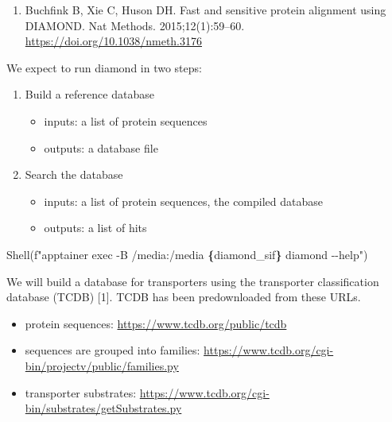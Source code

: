 \documentclass[
]{book}
\newenvironment{Shaded}{\begin{snugshade}}{\end{snugshade}}
\newcommand{\NormalTok}[1]{#1}
\newcommand{\SpecialCharTok}[1]{\textcolor[rgb]{0.81,0.36,0.00}{\textbf{#1}}}
\newcommand{\SpecialStringTok}[1]{\textcolor[rgb]{0.31,0.60,0.02}{#1}}
\providecommand{\tightlist}{%
  \setlength{\itemsep}{0pt}\setlength{\parskip}{0pt}}
\begin{document}
\begin{enumerate}
\def\labelenumi{\arabic{enumi}.}
\tightlist
\item
  Buchfink B, Xie C, Huson DH. Fast and sensitive protein alignment using DIAMOND. Nat Methods. 2015;12(1):59--60. \url{https://doi.org/10.1038/nmeth.3176}
\end{enumerate}

We expect to run diamond in two steps:

\begin{enumerate}
\def\labelenumi{\arabic{enumi}.}
\tightlist
\item
  Build a reference database

  \begin{itemize}
  \tightlist
  \item
    inputs: a list of protein sequences
  \item
    outputs: a database file
  \end{itemize}
\item
  Search the database

  \begin{itemize}
  \tightlist
  \item
    inputs: a list of protein sequences, the compiled database
  \item
    outputs: a list of hits
  \end{itemize}
\end{enumerate}

\begin{Shaded}
\begin{Highlighting}[numbers=left,,]
\NormalTok{Shell(}\SpecialStringTok{f"apptainer exec {-}B /media:/media }\SpecialCharTok{\{}\NormalTok{diamond\_sif}\SpecialCharTok{\}}\SpecialStringTok{ diamond {-}{-}help"}\NormalTok{)}
\end{Highlighting}
\end{Shaded}

We will build a database for transporters using the transporter classification database (TCDB) {[}1{]}.
TCDB has been predownloaded from these URLs.

\begin{itemize}
\tightlist
\item
  protein sequences: \url{https://www.tcdb.org/public/tcdb}
\item
  sequences are grouped into families: \url{https://www.tcdb.org/cgi-bin/projectv/public/families.py}
\item
  transporter substrates: \url{https://www.tcdb.org/cgi-bin/substrates/getSubstrates.py}
\end{itemize}
\end{document}
